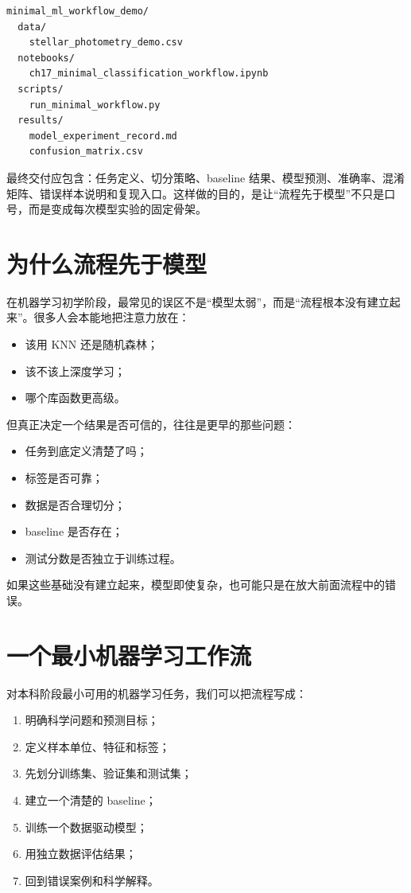 \begin{examplebox}
\begin{lstlisting}[style=terminal]
minimal_ml_workflow_demo/
  data/
    stellar_photometry_demo.csv
  notebooks/
    ch17_minimal_classification_workflow.ipynb
  scripts/
    run_minimal_workflow.py
  results/
    model_experiment_record.md
    confusion_matrix.csv
\end{lstlisting}
\end{examplebox}

最终交付应包含：任务定义、切分策略、baseline 结果、模型预测、准确率、混淆矩阵、错误样本说明和复现入口。这样做的目的，是让“流程先于模型”不只是口号，而是变成每次模型实验的固定骨架。

\section{为什么流程先于模型}

在机器学习初学阶段，最常见的误区不是“模型太弱”，而是“流程根本没有建立起来”。很多人会本能地把注意力放在：

\begin{itemize}
    \item 该用 KNN 还是随机森林；
    \item 该不该上深度学习；
    \item 哪个库函数更高级。
\end{itemize}

但真正决定一个结果是否可信的，往往是更早的那些问题：

\begin{itemize}
    \item 任务到底定义清楚了吗；
    \item 标签是否可靠；
    \item 数据是否合理切分；
    \item baseline 是否存在；
    \item 测试分数是否独立于训练过程。
\end{itemize}

如果这些基础没有建立起来，模型即使复杂，也可能只是在放大前面流程中的错误。

\section{一个最小机器学习工作流}

对本科阶段最小可用的机器学习任务，我们可以把流程写成：

\begin{enumerate}
    \item 明确科学问题和预测目标；
    \item 定义样本单位、特征和标签；
    \item 先划分训练集、验证集和测试集；
    \item 建立一个清楚的 baseline；
    \item 训练一个数据驱动模型；
    \item 用独立数据评估结果；
    \item 回到错误案例和科学解释。
\end{enumerate}

